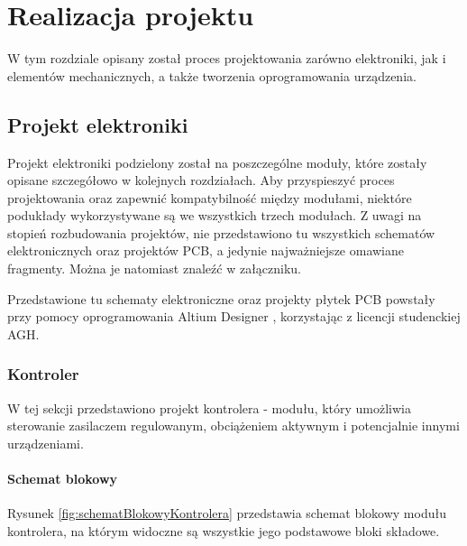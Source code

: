 \chapter{Realizacja projektu}
\label{chapter-4}


\vspace{0.5cm}


W tym rozdziale opisany został proces projektowania zarówno elektroniki, jak i elementów mechanicznych, a także tworzenia oprogramowania urządzenia.


\section{Projekt elektroniki}

Projekt elektroniki podzielony został na poszczególne moduły, które zostały opisane szczegółowo w kolejnych rozdziałach. 
Aby przyspieszyć proces projektowania oraz zapewnić kompatybilność między modułami, niektóre podukłady wykorzystywane są we wszystkich trzech modułach. 
Z uwagi na stopień rozbudowania projektów, nie przedstawiono tu wszystkich schematów elektronicznych oraz projektów PCB, a jedynie najważniejsze omawiane fragmenty. Można je natomiast znaleźć w załączniku.

Przedstawione tu schematy elektroniczne oraz projekty płytek PCB powstały przy pomocy oprogramowania Altium Designer \cite{altiumDesigner}, korzystając z licencji studenckiej AGH.


\subsection{Kontroler}

W tej sekcji przedstawiono projekt kontrolera - modułu, który umożliwia sterowanie zasilaczem regulowanym, obciążeniem aktywnym i potencjalnie innymi urządzeniami.

\subsubsection{Schemat blokowy}

Rysunek \ref{fig:schematBlokowyKontrolera} przedstawia schemat blokowy modułu kontrolera, na którym widoczne są wszystkie jego podstawowe bloki składowe.

